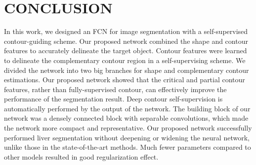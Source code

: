\documentclass[journal]{IEEEtran}
\begin{document}
\section{CONCLUSION}
In this work, we designed an FCN for image segmentation with a self-supervised contour-guiding scheme. Our proposed network combined the shape and contour features to accurately delineate the target object. Contour features were learned to delineate the complementary contour region in a self-supervising scheme. We divided the network into two big branches for shape and complementary contour estimations. Our proposed network showed that the critical and partial contour features, rather than fully-supervised contour, can effectively improve the performance of the segmentation result. Deep contour self-supervision is automatically performed by the output of the network. The building block of our network was a densely connected block with separable convolutions, which made the network more compact and representative. Our proposed network successfully performed liver segmentation without deepening or widening the neural network, unlike those in the state-of-the-art methods. Much fewer parameters compared to other models resulted in good regularization effect.




\ifCLASSOPTIONcaptionsoff
  \newpage
\fi




\end{document}
